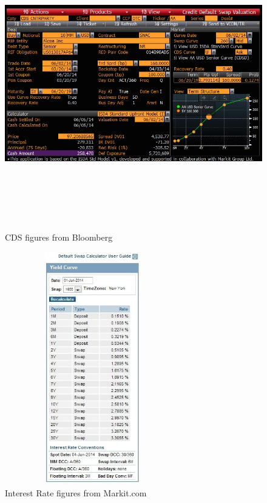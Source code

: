 \documentclass[a4paper]{article}
\begin{document}
\begin{figure}[ht!]
\centering
\includegraphics[width=6in, height=5in]{BloombergCDSAlcoa.png}
\caption{CDS figures from Bloomberg}
\end{figure}

\begin{figure}[ht!]
\centering
\includegraphics[width=3in, height=4in]{MarkitIRJun2.png}
\caption{Interest Rate figures from Markit.com}
\end{figure}
\end{document}
